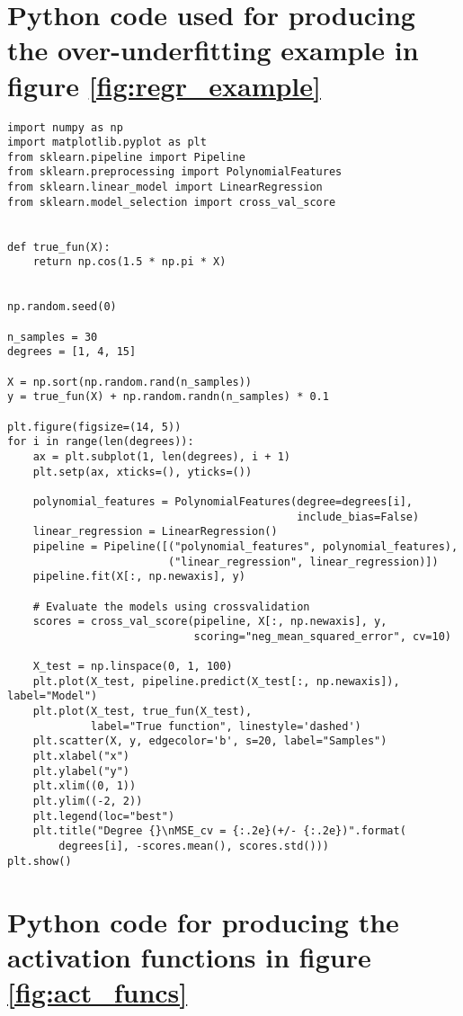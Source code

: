 \begin{appendices}

\section{Python code used for producing the over-underfitting example in figure \ref{fig:regr_example}} \label{app:overfitting}
\begin{lstlisting}
import numpy as np
import matplotlib.pyplot as plt
from sklearn.pipeline import Pipeline
from sklearn.preprocessing import PolynomialFeatures
from sklearn.linear_model import LinearRegression
from sklearn.model_selection import cross_val_score


def true_fun(X):
    return np.cos(1.5 * np.pi * X)


np.random.seed(0)

n_samples = 30
degrees = [1, 4, 15]

X = np.sort(np.random.rand(n_samples))
y = true_fun(X) + np.random.randn(n_samples) * 0.1

plt.figure(figsize=(14, 5))
for i in range(len(degrees)):
    ax = plt.subplot(1, len(degrees), i + 1)
    plt.setp(ax, xticks=(), yticks=())

    polynomial_features = PolynomialFeatures(degree=degrees[i],
                                             include_bias=False)
    linear_regression = LinearRegression()
    pipeline = Pipeline([("polynomial_features", polynomial_features),
                         ("linear_regression", linear_regression)])
    pipeline.fit(X[:, np.newaxis], y)

    # Evaluate the models using crossvalidation
    scores = cross_val_score(pipeline, X[:, np.newaxis], y,
                             scoring="neg_mean_squared_error", cv=10)

    X_test = np.linspace(0, 1, 100)
    plt.plot(X_test, pipeline.predict(X_test[:, np.newaxis]), label="Model")
    plt.plot(X_test, true_fun(X_test),
             label="True function", linestyle='dashed')
    plt.scatter(X, y, edgecolor='b', s=20, label="Samples")
    plt.xlabel("x")
    plt.ylabel("y")
    plt.xlim((0, 1))
    plt.ylim((-2, 2))
    plt.legend(loc="best")
    plt.title("Degree {}\nMSE_cv = {:.2e}(+/- {:.2e})".format(
        degrees[i], -scores.mean(), scores.std()))
plt.show()

\end{lstlisting}

\section{Python code for producing the activation functions in figure \ref{fig:act_funcs}} \label{app:act_funcs}


\end{appendices}
